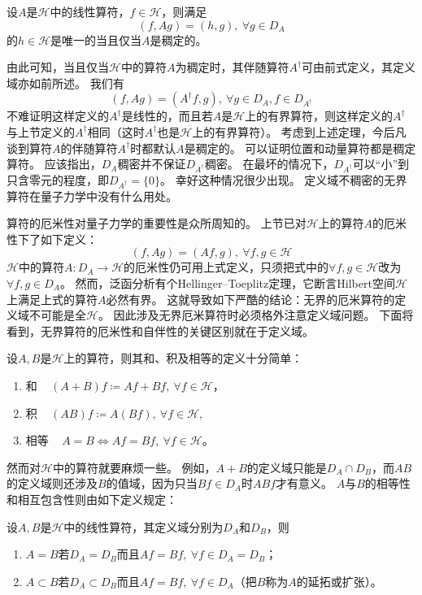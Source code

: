 \begin{theorem}
    设$A$是$\mathscr{H}$中的线性算符，$f \in \mathscr{H}$，则满足
    $$(f, Ag) = (h, g), ~ \forall g \in D_A$$
    的$h \in \mathscr{H}$是唯一的当且仅当$A$是稠定的。
\end{theorem}

由此可知，当且仅当$\mathscr{H}$中的算符$A$为稠定时，其伴随算符$A^\dagger$可由前式定义，其定义域亦如前所述。
我们有
$$(f, Ag) = (A^\dagger f, g), ~ \forall g \in D_A, f \in D_{A^\dagger}$$
不难证明这样定义的$A^\dagger$是线性的，而且若$A$是$\mathscr{H}$上的有界算符，则这样定义的$A^\dagger$与上节定义的$A^\dagger$相同（这时$A^\dagger$也是$\mathscr{H}$上的有界算符）。
考虑到上述定理，今后凡谈到算符$A$的伴随算符$A^\dagger$时都默认$A$是稠定的。
可以证明位置和动量算符都是稠定算符。
应该指出，$D_A$稠密并不保证$D_{A^\dagger}$稠密。
在最坏的情况下，$D_{A^\dagger}$可以``小''到只含零元的程度，即$D_{A^\dagger} = \{0\}$。
幸好这种情况很少出现。
定义域不稠密的无界算符在量子力学中没有什么用处。

算符的厄米性对量子力学的重要性是众所周知的。
上节已对$\mathscr{H}$上的算符$A$的厄米性下了如下定义：
$$(f, Ag) = (Af, g), ~ \forall f, g \in \mathscr{H}$$
$\mathscr{H}$中的算符$A \colon D_A \to \mathscr{H}$的厄米性仍可用上式定义，只须把式中的$\forall f, g \in \mathscr{H}$改为$\forall f, g \in D_A$。
然而，泛函分析有个Hellinger--Toeplitz定理，它断言Hilbert空间$\mathscr{H}$上满足上式的算符$A$必然有界。
这就导致如下严酷的结论：无界的厄米算符的定义域不可能是全$\mathscr{H}$。
因此涉及无界厄米算符时必须格外注意定义域问题。
下面将看到，无界算符的厄米性和自伴性的关键区别就在于定义域。

设$A, B$是$\mathscr{H}$上的算符，则其和、积及相等的定义十分简单：
\begin{enumerate}[]
    \item 和 ~ $(A + B)f \coloneq Af + Bf, ~ \forall f \in \mathscr{H}$，
    \item 积 ~ $(AB)f \coloneq A(Bf), ~ \forall f \in \mathscr{H}$,
    \item 相等 ~ $A = B \Leftrightarrow Af = Bf, ~ \forall f \in \mathscr{H}$。
\end{enumerate}
然而对$\mathscr{H}$中的算符就要麻烦一些。
例如，$A + B$的定义域只能是$D_A \cap D_B$，而$AB$的定义域则还涉及$B$的值域，因为只当$Bf \in D_A$时$ABf$才有意义。
$A$与$B$的相等性和相互包含性则由如下定义规定：

\begin{definition}
    设$A, B$是$\mathscr{H}$中的线性算符，其定义域分别为$D_A$和$D_B$，则
    \begin{enumerate}[（a）]
        \item $A = B$若$D_A = D_B$而且$Af = Bf, ~ \forall f \in D_A = D_B$；
        \item $A \subset B$若$D_A \subset D_B$而且$Af = Bf, ~ \forall f \in D_A$（把$B$称为$A$的延拓或扩张）。
    \end{enumerate}
\end{definition}

